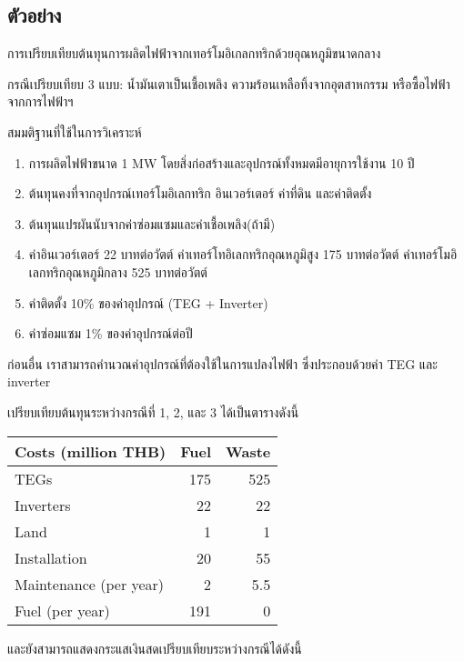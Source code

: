 \documentclass[11pt]{article}
\begin{document}
\subsection{ตัวอย่าง}
\label{sec:orgb51cf83}
การเปรียบเทียบต้นทุนการผลิตไฟฟ้าจากเทอร์โมอิเกลกทริกด้วยอุณหภูมิขนาดกลาง

กรณีเปรียบเทียบ 3 แบบ: น้ำมันเตาเป็นเชื้อเพลิง ความร้อนเหลือทิ้งจากอุตสาหกรรม หรือซื้อไฟฟ้าจากการไฟฟ้าฯ

สมมติฐานที่ใช้ในการวิเคราะห์ 

\begin{enumerate}
\item การผลิตไฟฟ้าขนาด 1 MW โดยสิ่งก่อสร้างและอุปกรณ์ทั้งหมดมีอายุการใช้งาน 10 ปี
\item ต้นทุนคงที่จากอุปกรณ์เทอร์โมอิเลกทริก อินเวอร์เตอร์ ค่าที่ดิน และค่าติดตั้ง
\item ต้นทุนแปรผันนับจากค่าซ่อมแซมและค่าเชื้อเพลิง(ถ้ามี)
\item ค่าอินเวอร์เตอร์ 22 บาทต่อวัตต์ ค่าเทอร์โทอิเลกทริกอุณหภูมิสูง 175 บาทต่อวัตต์ ค่าเทอร์โมอิเลกทริกอุณหภูมิกลาง 525 บาทต่อวัตต์
\item ค่าติดตั้ง 10\% ของค่าอุปกรณ์ (TEG + Inverter)
\item ค่าซ่อมแซม 1\% ของค่าอุปกรณ์ต่อปี
\end{enumerate}

ก่อนอื่น เราสามารถคำนวณค่าอุปกรณ์ที่ต้องใช้ในการแปลงไฟฟ้า ซึ่งประกอบด้วยค่า TEG และ inverter 

เปรียบเทียบต้นทุนระหว่างกรณีที่ 1, 2, และ 3 ได้เป็นตารางดังนี้

\begin{center}
\begin{tabular}{lrr}
\hline
Costs (million THB) & Fuel & Waste\\
\hline
TEGs & 175 & 525\\
Inverters & 22 & 22\\
Land & 1 & 1\\
Installation & 20 & 55\\
Maintenance (per year) & 2 & 5.5\\
Fuel (per year) & 191 & 0\\
\hline
\end{tabular}
\end{center}

และยังสามารถแสดงกระแสเงินสดเปรียบเทียบระหว่างกรณีได้ดังนี้
\end{document}
